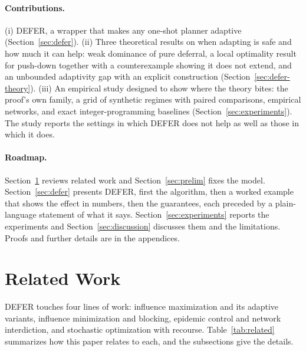 \documentclass[11pt]{article}
\theoremstyle{definition}
\theoremstyle{remark}
\begin{document}
\paragraph{Contributions.} (i) DEFER, a wrapper that makes any one-shot planner adaptive (Section~\ref{sec:defer}). (ii) Three theoretical results on when adapting is safe and how much it can help: weak dominance of pure deferral, a local optimality result for push-down together with a counterexample showing it does not extend, and an unbounded adaptivity gap with an explicit construction (Section~\ref{sec:defer-theory}). (iii) An empirical study designed to show where the theory bites: the proof's own family, a grid of synthetic regimes with paired comparisons, empirical networks, and exact integer-programming baselines (Section~\ref{sec:experiments}). The study reports the settings in which DEFER does not help as well as those in which it does.

\paragraph{Roadmap.} Section~\ref{sec:related} reviews related work and Section~\ref{sec:prelim} fixes the model. Section~\ref{sec:defer} presents DEFER, first the algorithm, then a worked example that shows the effect in numbers, then the guarantees, each preceded by a plain-language statement of what it says. Section~\ref{sec:experiments} reports the experiments and Section~\ref{sec:discussion} discusses them and the limitations. Proofs and further details are in the appendices.

\section{Related Work}\label{sec:related}

DEFER touches four lines of work: influence maximization and its adaptive variants, influence minimization and blocking, epidemic control and network interdiction, and stochastic optimization with recourse. Table~\ref{tab:related} summarizes how this paper relates to each, and the subsections give the details.
\end{document}
